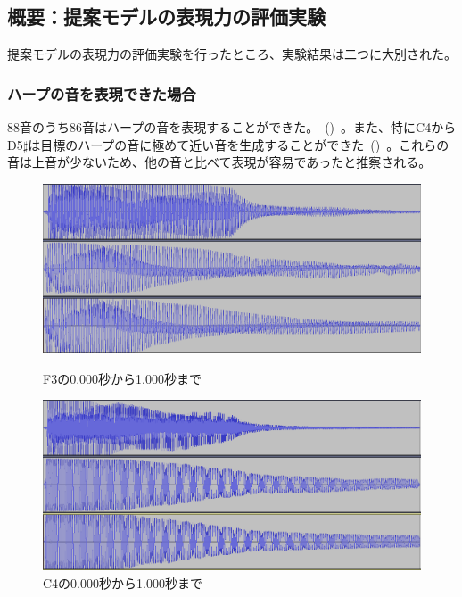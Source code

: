 \subsection{概要：提案モデルの表現力の評価実験}

提案モデルの表現力の評価実験を行ったところ、実験結果は二つに大別された。

\subsubsection{ハープの音を表現できた場合}

88音のうち86音はハープの音を表現することができた。~()~。また、特にC4からD5$\sharp$は目標のハープの音に極めて近い音を生成することができた~()~。これらの音は上音が少ないため、他の音と比べて表現が容易であったと推察される。

\begin{figure}[b]
\centering
\begin{minipage}[b]{0.48\columnwidth}
\centering
\includegraphics[width=0.9\columnwidth]{figure/88_88/f3.png}
\caption[F3の音波]{F3の0.000秒から1.000秒まで}
\label{fig:88_88_good1}
\end{minipage}
\begin{minipage}[b]{0.48\columnwidth}
\centering
\includegraphics[width=0.9\columnwidth]{figure/88_88/c4.png}
\caption[C4の音波]{C4の0.000秒から1.000秒まで}
\label{fig:88_88_good2}
\end{minipage}
\end{figure}

